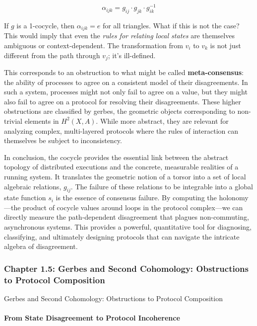\documentclass[
]{article}
\begin{document}
\[\alpha_{ijk} = g_{ij} \cdot g_{jk} \cdot g_{ik}^{-1}\]

If \(g\) is a 1-cocycle, then \(\alpha_{ijk} = e\) for all triangles.
What if this is not the case? This would imply that even the \emph{rules
for relating local states} are themselves ambiguous or
context-dependent. The transformation from \(v_i\) to \(v_k\) is not
just different from the path through \(v_j\); it's ill-defined.

This corresponds to an obstruction to what might be called
\textbf{meta-consensus}: the ability of processes to agree on a
consistent model of their disagreements. In such a system, processes
might not only fail to agree on a value, but they might also fail to
agree on a protocol for resolving their disagreements. These higher
obstructions are classified by gerbes, the geometric objects
corresponding to non-trivial elements in \(H^2(X, A)\). While more
abstract, they are relevant for analyzing complex, multi-layered
protocols where the rules of interaction can themselves be subject to
inconsistency.

In conclusion, the cocycle provides the essential link between the
abstract topology of distributed executions and the concrete, measurable
realities of a running system. It translates the geometric notion of a
torsor into a set of local algebraic relations, \(g_{ij}\). The failure
of these relations to be integrable into a global state function \(s_i\)
is the essence of consensus failure. By computing the holonomy---the
product of cocycle values around loops in the protocol complex---we can
directly measure the path-dependent disagreement that plagues
non-commuting, asynchronous systems. This provides a powerful,
quantitative tool for diagnosing, classifying, and ultimately designing
protocols that can navigate the intricate algebra of disagreement.

\subsubsection{Chapter 1.5: Gerbes and Second Cohomology: Obstructions
to Protocol
Composition}\label{chapter-1.5-gerbes-and-second-cohomology-obstructions-to-protocol-composition}

\protect{}\label{chapter-1-5-Gerbes_and_Second_Cohomology__Obstructio}{}

Gerbes and Second Cohomology: Obstructions to Protocol Composition

\paragraph{From State Disagreement to Protocol
Incoherence}\label{from-state-disagreement-to-protocol-incoherence}
\end{document}
